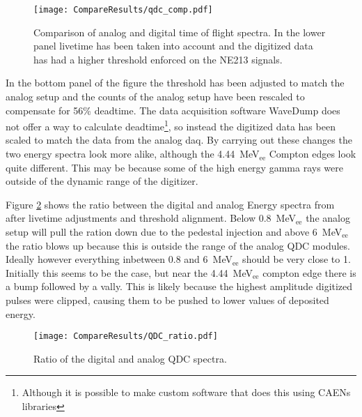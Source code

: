 \documentclass[main.tex]{subfiles}
\begin{document}
\begin{figure}[h]
    \centering
        \texttt{[image: CompareResults/qdc\_comp.pdf]}
        \caption{Comparison of analog and digital time of flight spectra. In the lower panel livetime has been taken into account and the digitized data has had a higher threshold enforced on the NE213 signals.}
    \label{fig:qdc_comp}
\end{figure}

In the bottom panel of the figure the threshold has been adjusted to match the analog setup and the counts of the analog setup have been rescaled to compensate for 56\% deadtime. The data acquisition software WaveDump does not offer a way to calculate deadtime\footnote{Although it is possible to make custom software that does this using CAENs libraries}, so instead the digitized data has been scaled to match the data from the analog daq. By carrying out these changes the two energy spectra look more alike, although the \SI{4.44}{\MeV}$_\text{ee}$ Compton edges look quite different. This may be because some of the high energy gamma rays were outside of the dynamic range of the digitizer.

Figure \ref{fig:qdc_ratio} shows the ratio between the digital and analog Energy spectra from after livetime adjustments and threshold alignment. Below \SI{0.8}{\MeV}$_\text{ee}$ the analog setup will pull the ration down due to the pedestal injection and above \SI{6}{\MeV}$_\text{ee}$ the ratio blows up because this is outside the range of the analog QDC modules. Ideally however everything inbetween 0.8 and \SI{6}{\MeV}$_\text{ee}$ should be very close to 1. Initially this seems to be the case, but near the \SI{4.44}{\MeV}$_\text{ee}$ compton edge there is a bump followed by a vally. This is likely because the highest amplitude digitized pulses were clipped, causing them to be pushed to lower values of deposited energy.
\begin{figure}[h]
    \centering
        \texttt{[image: CompareResults/QDC\_ratio.pdf]}
        \caption{Ratio of the digital and analog QDC spectra.}
    \label{fig:qdc_ratio}
\end{figure}
\end{document}
